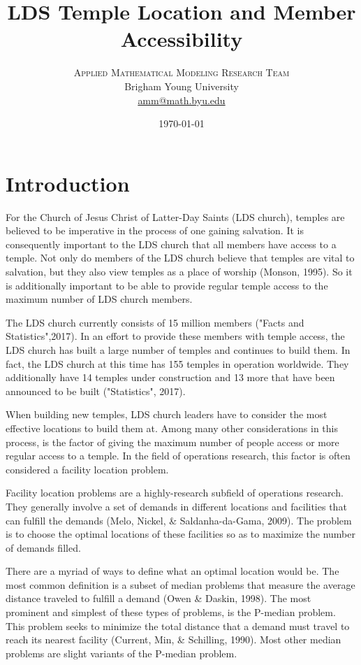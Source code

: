 \documentclass[twoside,twocolumn]{article}
\title{LDS Temple Location and Member Accessibility} %
\author{%
\textsc{Applied Mathematical Modeling Research Team}\\[1ex] %
\normalsize Brigham Young University  \\ %
\normalsize \href{mailto:amm@math.byu.edu}{amm@math.byu.edu} %
}
\date{\today} %
\begin{document}
\maketitle



\section{Introduction}

For the Church of Jesus Christ of Latter-Day Saints (LDS church), temples are believed to be imperative in the process of one gaining salvation.
It is consequently important to the LDS church that all members have access to a temple.
Not only do members of the LDS church believe that temples are vital to salvation, but they also view temples as a place of worship (Monson, 1995).
So it is additionally important to be able to provide regular temple access to the maximum number of LDS church members.

The LDS church currently consists of 15 million members ("Facts and Statistics",2017).
In an effort to provide these members with temple access, the LDS church has built a large number of temples and continues to build them.
In fact, the LDS church at this time has 155 temples in operation worldwide. 
They additionally have 14 temples under construction and 13 more that have been announced to be built ("Statistics", 2017).

When building new temples, LDS church leaders have to consider the most effective locations to build them at.
Among many other considerations in this process, is the factor of giving the maximum number of people access or more regular access to a temple.
In the field of operations research, this factor is often considered a facility location problem.

Facility location problems are a highly-research subfield of operations research. 
They generally involve a set of demands in different locations and facilities that can fulfill the demands (Melo, Nickel, \& Saldanha-da-Gama, 2009).
The problem is to choose the optimal locations of these facilities so as to maximize the number of demands filled.

There are a myriad of ways to define what an optimal location would be.
The most common definition is a subset of median problems that measure the average distance traveled to fulfill a demand (Owen \& Daskin, 1998). 
The most prominent and simplest of these types of problems, is the P-median problem.
This problem seeks to minimize the total distance that a demand must travel to reach its nearest facility (Current, Min, \& Schilling, 1990).
Most other median problems are slight variants of the P-median problem.
\end{document}
